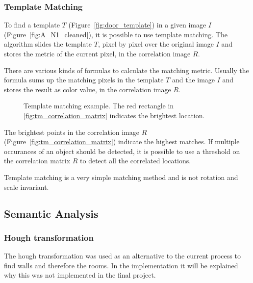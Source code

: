 \subsubsection{Template Matching}
\label{sub:TemplateMatching}
To find a template $T$ (Figure~\ref{fig:door_template}) in a given image $I$ (Figure~\ref{fig:A_N1_cleaned}), it is possible to use template matching. The algorithm slides the template $T$, pixel by pixel over the original image $I$ and stores the metric of the current pixel, in the correlation image $R$.

There are various kinds of formulas to calculate the matching metric. Usually the formula sums up the matching pixels in the template $T$ and the image $I$ and stores the result as color value, in the correlation image $R$.

\begin{figure}[h!]
	\centering
	\hfill
	\hfill
	\caption{Template matching example. The red rectangle in \ref{fig:tm_correlation_matrix} indicates the brightest location.}
	\label{fig:TemplateMatchingExample}
\end{figure}


The brightest points in the correlation image $R$ (Figure~\ref{fig:tm_correlation_matrix})  indicate the highest matches. If multiple occurances of an object should be detected, it is possible to use a threshold on the correlation matrix $R$ to detect all the correlated locations.

Template matching is a very simple matching method and is not rotation and scale invariant.



 
\subsection{Semantic Analysis}
\subsubsection{Hough transformation}
\label{subsubsec:Hough transformation}
The hough transformation was used as an alternative to the current process to find walls and therefore the rooms. In the implementation it will be explained why this was not implemented in the final project.

